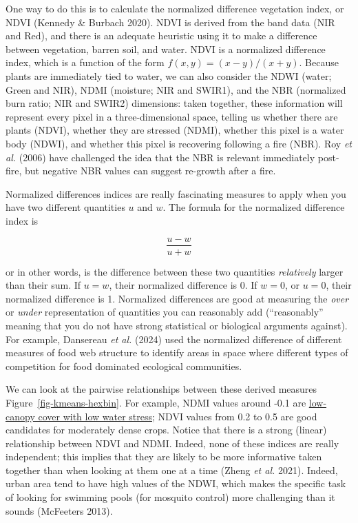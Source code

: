 \documentclass[
  letterpaper,
]{scrbook}
\begin{document}
One way to do this is to calculate the normalized difference vegetation
index, or NDVI (Kennedy \& Burbach 2020). NDVI is derived from the band
data (NIR and Red), and there is an adequate heuristic using it to make
a difference between vegetation, barren soil, and water. NDVI is a
normalized difference index, which is a function of the form
\(f(x,y) = (x-y)/(x+y)\). Because plants are immediately tied to water,
we can also consider the NDWI (water; Green and NIR), NDMI (moisture;
NIR and SWIR1), and the NBR (normalized burn ratio; NIR and SWIR2)
dimensions: taken together, these information will represent every pixel
in a three-dimensional space, telling us whether there are plants
(NDVI), whether they are stressed (NDMI), whether this pixel is a water
body (NDWI), and whether this pixel is recovering following a fire
(NBR). Roy \emph{et al.} (2006) have challenged the idea that the NBR is
relevant immediately post-fire, but negative NBR values can suggest
re-growth after a fire.

Normalized differences indices are really fascinating measures to apply
when you have two different quantities \(u\) and \(w\). The formula for
the normalized difference index is

\[\frac{u-w}{u+w}\]

or in other words, is the difference between these two quantities
\emph{relatively} larger than their sum. If \(u = w\), their normalized
difference is 0. If \(w = 0\), or \(u = 0\), their normalized difference
is 1. Normalized differences are good at measuring the \emph{over} or
\emph{under} representation of quantities you can reasonably add
(``reasonably'' meaning that you do not have strong statistical or
biological arguments against). For example, Dansereau \emph{et al.}
(2024) used the normalized difference of different measures of food web
structure to identify areas in space where different types of
competition for food dominated ecological communities.

We can look at the pairwise relationships between these derived measures
Figure~\ref{fig-kmeans-hexbin}. For example, NDMI values around -0.1 are
\href{https://eos.com/make-an-analysis/ndmi/}{low-canopy cover with low
water stress}; NDVI values from 0.2 to 0.5 are good candidates for
moderately dense crops. Notice that there is a strong (linear)
relationship between NDVI and NDMI. Indeed, none of these indices are
really independent; this implies that they are likely to be more
informative taken together than when looking at them one at a time
(Zheng \emph{et al.} 2021). Indeed, urban area tend to have high values
of the NDWI, which makes the specific task of looking for swimming pools
(for mosquito control) more challenging than it sounds (McFeeters 2013).
\end{document}

